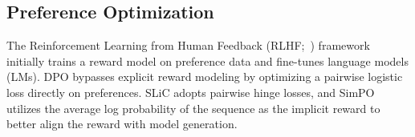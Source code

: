 \subsection{Preference Optimization}
The Reinforcement Learning from Human Feedback (RLHF;~\citet{christiano2017deep}) framework initially trains a reward model on preference data and fine-tunes language models (LMs).
% 
DPO \citep{rafailov2024direct} bypasses explicit reward modeling by optimizing a pairwise logistic loss directly on preferences. 
% 
SLiC \cite{zhao2023slic} adopts pairwise hinge losses, and SimPO \citep{meng2024simpo} utilizes the average log probability of the sequence as the implicit reward to better align the reward with model generation.
% 
%